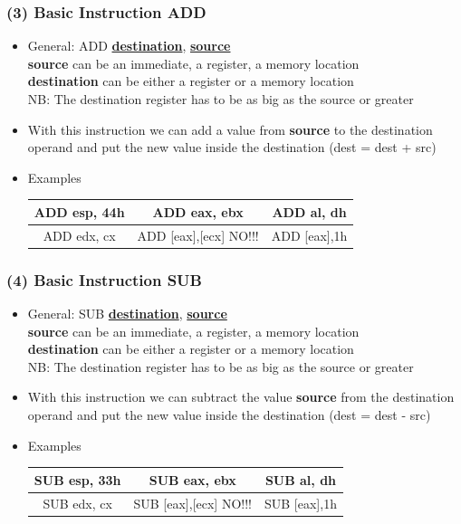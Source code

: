 \documentclass[]{beamer}
\begin{document}
		\begin{frame}
			\frametitle{(3) Basic Instruction ADD}
			\begin{itemize}
					\item{General: ADD \underline{\textbf{destination}}, \underline{\textbf{source}}}\\
					\textbf{source} can be an immediate, a register, a memory location\\
					\textbf{destination} can be either a register or a memory location\\
					NB: The destination register has to be as big as the source or greater 
					\item{With this instruction we can add a value from \textbf{source}  to the destination operand and put the new value inside the destination (dest = dest + src)}
					\item{Examples}
					\begin{table}[h]
						\begin{tabular}{|c|c|c|}
							\hline
							ADD esp, 44h&ADD eax, ebx&ADD al, dh\\
							\hline
							ADD  edx, cx&ADD [eax],[ecx] \color{red}NO!!!&ADD [eax],1h\\
							\hline
						\end{tabular}
					\end{table}

			\end{itemize}
		\end{frame}
		\begin{frame}
			\frametitle{(4) Basic Instruction SUB}
			\begin{itemize}
				\item{General: SUB \underline{\textbf{destination}}, \underline{\textbf{source}}}\\
				\textbf{source} can be an immediate, a register, a memory location\\
				\textbf{destination} can be either a register or a memory location\\
					NB: The destination register has to be as big as the source or greater 
				\item{With this instruction we can subtract the value \textbf{source}  from the destination operand and put the new value inside the destination (dest = dest - src)}

				\item{Examples}
					\begin{table}[h]
						\begin{tabular}{|c|c|c|}
							\hline
							SUB esp, 33h&SUB eax, ebx&SUB al, dh\\
							\hline
							SUB edx, cx&SUB [eax],[ecx] \color{red}NO!!!&SUB [eax],1h\\
							\hline
						\end{tabular}
					\end{table}

			\end{itemize}
		\end{frame}
\end{document}

